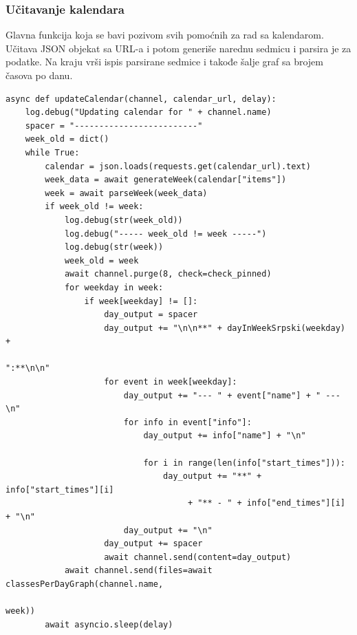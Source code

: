 \documentclass[a4paper,11pt]{article}
\begin{document}
\subsubsection{Učitavanje kalendara}
Glavna funkcija koja se bavi pozivom svih pomoćnih za rad sa kalendarom. Učitava JSON objekat sa URL-a i potom generiše narednu sedmicu i parsira je za podatke. Na kraju vrši ispis parsirane sedmice i takođe šalje graf sa brojem časova po danu.
\begin{verbatim}
async def updateCalendar(channel, calendar_url, delay):
    log.debug("Updating calendar for " + channel.name)
    spacer = "-------------------------"
    week_old = dict()
    while True:
        calendar = json.loads(requests.get(calendar_url).text)
        week_data = await generateWeek(calendar["items"])
        week = await parseWeek(week_data)
        if week_old != week:
            log.debug(str(week_old))
            log.debug("----- week_old != week -----")
            log.debug(str(week))
            week_old = week
            await channel.purge(8, check=check_pinned)
            for weekday in week:
                if week[weekday] != []:
                    day_output = spacer
                    day_output += "\n\n**" + dayInWeekSrpski(weekday) + 
                                                               ":**\n\n"
                    for event in week[weekday]:
                        day_output += "--- " + event["name"] + " ---\n"
                        for info in event["info"]:
                            day_output += info["name"] + "\n"

                            for i in range(len(info["start_times"])):
                                day_output += "**" + info["start_times"][i]
                                     + "** - " + info["end_times"][i] + "\n"
                        day_output += "\n"
                    day_output += spacer
                    await channel.send(content=day_output)
            await channel.send(files=await classesPerDayGraph(channel.name,
                                                                      week))
        await asyncio.sleep(delay)
\end{verbatim}
\newpage
\end{document}
